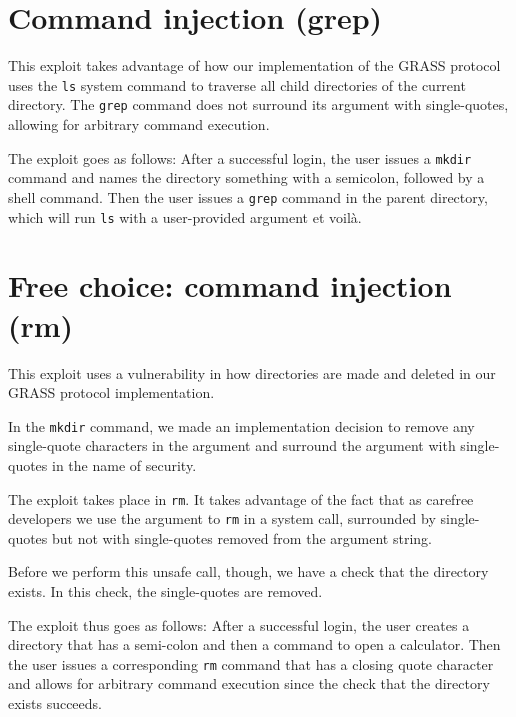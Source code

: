 \documentclass{article}
\begin{document}
\section{Command injection (grep)}

This exploit takes advantage of how our implementation of the GRASS protocol uses the \texttt{ls} system command to traverse all child directories of the current directory.
The \texttt{grep} command does not surround its argument with single-quotes, allowing for arbitrary command execution.

The exploit goes as follows: After a successful login, the user issues a \texttt{mkdir} command
and names the directory something with a semicolon, followed by a shell command. Then the user issues a \texttt{grep} command in the parent directory, which will run \texttt{ls} with a user-provided argument et voilà.


\section{Free choice: command injection (rm)}

This exploit uses a vulnerability in how directories are made and deleted in our GRASS protocol implementation.

In the \texttt{mkdir} command, we made an implementation decision to remove any single-quote characters in the argument and surround the argument with single-quotes in the name of security.

The exploit takes place in \texttt{rm}.
It takes advantage of the fact that as carefree developers we use the argument to \texttt{rm} in a system call, surrounded by single-quotes but not with single-quotes removed from the argument string.

Before we perform this unsafe call, though, we have a check that the directory exists.
In this check, the single-quotes are removed.

The exploit thus goes as follows: After a successful login, the user creates a directory that has a semi-colon and then a command to open a calculator.
Then the user issues a corresponding \texttt{rm} command that has a closing quote character and allows for arbitrary command execution since the check that the directory exists succeeds.
\end{document}
